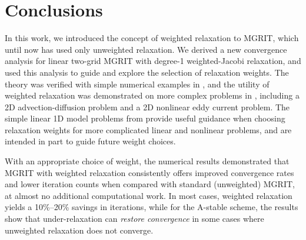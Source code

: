 \documentclass[VANCOUVER,STIX1COL]{WileyNJD-v2}
\begin{document}
\section{Conclusions}
\label{sec:conc}
In this work, we introduced the concept of weighted relaxation to MGRIT, which until now has used only unweighted relaxation. We derived a new convergence analysis for linear two-grid MGRIT with degree-1 weighted-Jacobi relaxation, and used this analysis to guide and explore  the selection of relaxation weights. The theory was verified with simple numerical examples in , and the utility of weighted relaxation was demonstrated on more complex problems in , including a 2D advection-diffusion problem and a 2D nonlinear eddy current problem. The simple linear 1D model problems from  provide useful guidance when choosing relaxation weights for more complicated linear and nonlinear problems, and are intended in part to guide future weight choices.

With an appropriate choice of weight, the numerical results demonstrated that MGRIT with weighted relaxation consistently offers improved convergence rates and lower iteration counts when compared with standard (unweighted) MGRIT, at almost no additional computational work. In most cases, weighted relaxation yields a 10\%--20\% savings in iterations, while for the A-stable scheme, the results show that under-relaxation can \emph{restore convergence} in some cases where unweighted relaxation does not converge.




\end{document}
